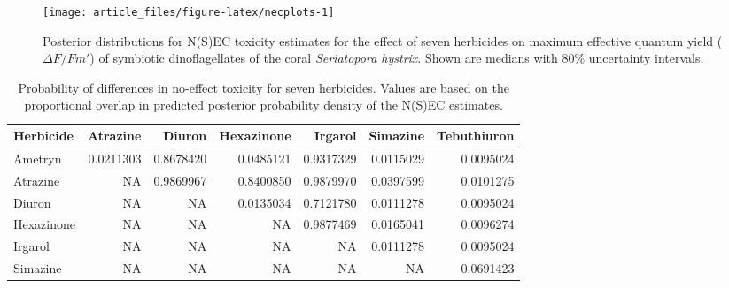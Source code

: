 \documentclass[
  shortnames]{jss}
\begin{document}
\begin{CodeChunk}
\end{CodeChunk}

\begin{CodeChunk}
\begin{figure}[!ht]

{\centering \texttt{[image: article\_files/figure-latex/necplots-1]} 

}

\caption[Posterior distributions for N(S)EC toxicity estimates for the effect of seven herbicides on maximum effective quantum yield ($\Delta F / Fm'$) of symbiotic dinoflagellates of the coral \textit{Seriatopora hystrix}]{Posterior distributions for N(S)EC toxicity estimates for the effect of seven herbicides on maximum effective quantum yield ($\Delta F / Fm'$) of symbiotic dinoflagellates of the coral \textit{Seriatopora hystrix}. Shown are medians with 80\%  uncertainty intervals.}\label{fig:necplots}
\end{figure}
\end{CodeChunk}

\begin{CodeChunk}
\begin{table}

\caption{\label{tab:probdiffs}Probability of differences in no-effect toxicity for seven herbicides. Values are based on the proportional overlap in predicted posterior probability density of the N(S)EC estimates.}
\centering
\begin{tabular}[t]{l|r|r|r|r|r|r}
\hline
Herbicide & Atrazine & Diuron & Hexazinone & Irgarol & Simazine & Tebuthiuron\\
\hline
Ametryn & 0.0211303 & 0.8678420 & 0.0485121 & 0.9317329 & 0.0115029 & 0.0095024\\
\hline
Atrazine & NA & 0.9869967 & 0.8400850 & 0.9879970 & 0.0397599 & 0.0101275\\
\hline
Diuron & NA & NA & 0.0135034 & 0.7121780 & 0.0111278 & 0.0095024\\
\hline
Hexazinone & NA & NA & NA & 0.9877469 & 0.0165041 & 0.0096274\\
\hline
Irgarol & NA & NA & NA & NA & 0.0111278 & 0.0095024\\
\hline
Simazine & NA & NA & NA & NA & NA & 0.0691423\\
\hline
\end{tabular}
\end{table}

\end{CodeChunk}
\end{document}
